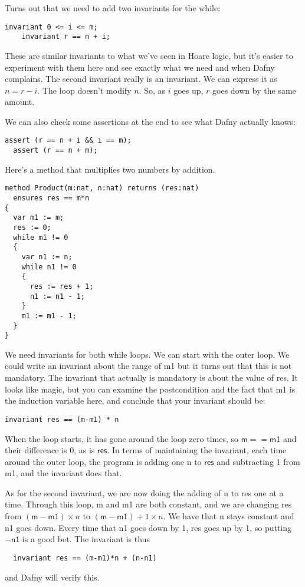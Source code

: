\documentclass[11pt]{article}
\begin{document}
Turns out that we need to add two invariants for the while:
\begin{lstlisting}[language=dafny]
    invariant 0 <= i <= m;
    invariant r == n + i;
\end{lstlisting}
These are similar invariants to what we've seen in Hoare logic, but it's easier to experiment with them here and see exactly what we need and when Dafny complains.
The second invariant really is an invariant. We can express it as $n = r - i$. The loop doesn't modify $n$. So, as $i$ goes up, $r$ goes down by the same amount.

We can also check some assertions at the end to see what Dafny actually knows:
\begin{lstlisting}[language=dafny]
  assert (r == n + i && i == m);
  assert (r == n + m);
\end{lstlisting}

Here's a method that multiplies two numbers by addition.
\begin{lstlisting}[language=dafny]
method Product(m:nat, n:nat) returns (res:nat)
  ensures res == m*n
{
  var m1 := m;
  res := 0;
  while m1 != 0
  {
    var n1 := n;
    while n1 != 0
    {
      res := res + 1;
      n1 := n1 - 1;
    }
    m1 := m1 - 1;
  }
}
\end{lstlisting}
We need invariants for both \textsf{while} loops. We can start with the outer loop.
We could write an invariant about the range of \textsf{m1} but it turns out that this is not
mandatory. The invariant that actually is mandatory is about the value of \textsf{res}.
It looks like magic, but you can examine the postcondition and the fact that \textsf{m1}
is the induction variable here, and conclude that your invariant should be:
\begin{lstlisting}[language=dafny]
  invariant res == (m-m1) * n
\end{lstlisting}
When the loop starts, it has gone around the loop zero times, so
$\mathsf{m} == \mathsf{m1}$ and their difference is 0, as is
$\mathsf{res}$.  In terms of maintaining the invariant, each time around
the outer loop, the program is adding one \textsf{n} to $\mathsf{res}$
and subtracting 1 from \textsf{m1}, and the invariant does that.

As for the second invariant, we are now doing the adding of \textsf{n} to \textsf{res} one at a time.
Through this loop, \textsf{m} and \textsf{m1} are both constant, and we are changing \textsf{res}
from $(\mathsf{m}-\mathsf{m1}) \times n$ to $(\mathsf{m}-\mathsf{m1}) + 1 \times n$. We have that \textsf{n} stays constant
and \textsf{n1} goes down. Every time that \textsf{n1} goes down by 1, \textsf{res} goes up by 1,
so putting $-\mathsf{n1}$ is a good bet.
The invariant is thus
\begin{lstlisting}
  invariant res == (m-m1)*n + (n-n1)
\end{lstlisting}
and Dafny will verify this.
\end{document}
